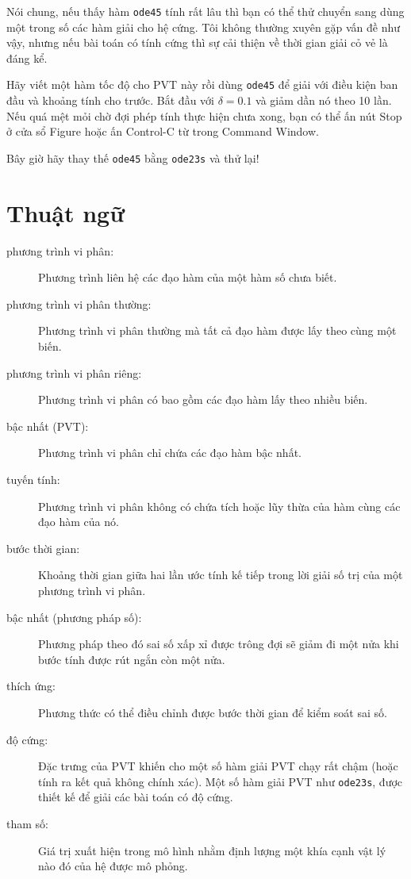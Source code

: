 \documentclass[12pt]{book}
\begin{document}
Nói chung, nếu thấy hàm {\tt ode45} tính rất lâu thì bạn có thể
thử chuyển sang dùng một trong số các hàm giải cho hệ cứng.
Tôi không thường xuyên gặp vấn đề như vậy, nhưng nếu bài toán
có tính cứng thì sự cải thiện về thời gian giải cỏ vẻ là đáng kể.

\begin{ex}
Hãy viết một hàm tốc độ cho PVT này rồi dùng {\tt ode45}
để giải với điều kiện ban đầu và khoảng tính cho trước.
Bắt đầu với $\delta = 0.1$ và giảm dần nó theo 10 lần. Nếu
quá mệt mỏi chờ đợi phép tính thực hiện chưa xong, bạn có thể
ấn nút Stop ở cửa sổ Figure hoặc ấn Control-C từ trong Command Window.

Bây giờ hãy thay thế {\tt ode45} bằng {\tt ode23s} và thử lại!
\end{ex}



\section{Thuật ngữ}

\begin{description}

\item[phương trình vi phân:] Phương trình liên hệ các đạo hàm
của một hàm số chưa biết.

\item[phương trình vi phân thường:] Phương trình vi phân thường mà
tất cả đạo hàm được lấy theo cùng một biến.

\item[phương trình vi phân riêng:] Phương trình vi phân có bao gồm các
đạo hàm lấy theo nhiều biến.

\item[bậc nhất (PVT):] Phương trình vi phân chỉ chứa các đạo hàm bậc nhất.

\item[tuyến tính:] Phương trình vi phân không có chứa tích hoặc lũy thừa
của hàm cùng các đạo hàm của nó.

\item[bước thời gian:] Khoảng thời gian giữa hai lần ước tính kế tiếp trong
lời giải số trị của một phương trình vi phân.

\item[bậc nhất (phương pháp số):] Phương pháp theo đó sai số xấp xỉ
được trông đợi sẽ giảm đi một nửa khi bước tính được rút ngắn còn một nửa.

\item[thích ứng:] Phương thức có thể điều chỉnh được bước thời gian để
kiểm soát sai số.

\item[độ cứng:] Đặc trưng của PVT khiến cho một số hàm giải PVT chạy
rất chậm (hoặc tính ra kết quả không chính xác). Một số hàm giải PVT
như {\tt ode23s}, được thiết kế để giải các bài toán có độ cứng.

\item[tham số:] Giá trị xuất hiện trong mô hình nhằm định lượng một khía
cạnh vật lý nào đó của hệ được mô phỏng.

\end{description}
\end{document}
